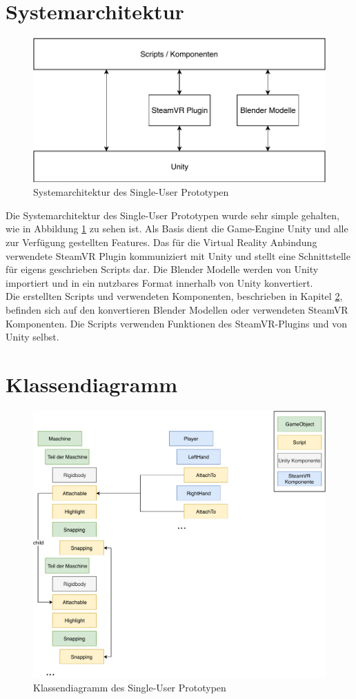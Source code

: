 \section{Systemarchitektur}
\label{ch:systemarchitektur_single_user}
\begin{figure}[h!]
	\centering
	\includegraphics[keepaspectratio,width=0.65\linewidth]{img/ArchitekturT1.pdf}
	\caption{Systemarchitektur des Single-User Prototypen}
	\label{fig:systemarchitektur_single_user}
\end{figure}

Die Systemarchitektur des Single-User Prototypen wurde sehr simple gehalten, wie in Abbildung \ref{fig:systemarchitektur_single_user} zu sehen ist. Als Basis dient die Game-Engine Unity und alle zur Verfügung gestellten Features. Das für die Virtual Reality Anbindung verwendete SteamVR Plugin kommuniziert mit Unity und stellt eine Schnittstelle für eigens geschrieben Scripts dar. Die Blender Modelle werden von Unity importiert und in ein nutzbares Format innerhalb von Unity konvertiert. \\
Die erstellten Scripts und verwendeten Komponenten, beschrieben in Kapitel \ref{ch:klassendiagram_single_user}, befinden sich auf den konvertieren Blender Modellen oder verwendeten SteamVR Komponenten. Die Scripts verwenden Funktionen des SteamVR-Plugins und von Unity selbst.


\section{Klassendiagramm}
\label{ch:klassendiagram_single_user}

\begin{figure}[h!]
	\centering
	\includegraphics[keepaspectratio,width=0.75\linewidth]{img/Klassendiagramm_T1.pdf}
	\caption{Klassendiagramm des Single-User Prototypen}
	\label{fig:klassendiagramm_single_user}
\end{figure}

